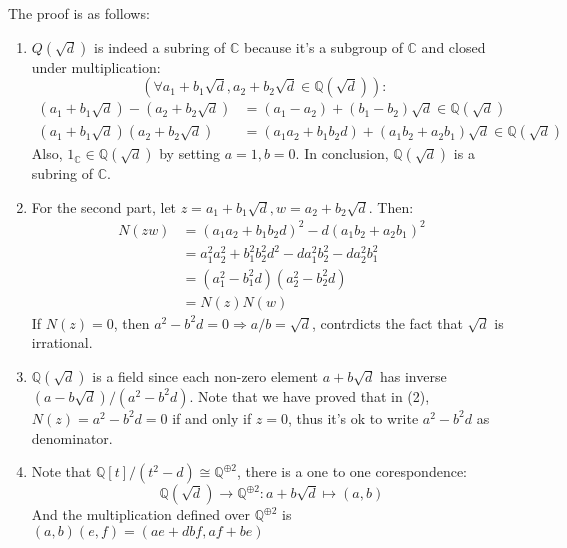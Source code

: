 \documentclass[a4paper, pdf, 12pt]{article}
\makeatletter
\renewenvironment{proof}[1][\proofname]{\par
  \pushQED{\qed}%
  \normalfont \topsep6\p@\@plus6\p@\relax
  \trivlist
  \item[%
    \hskip\labelsep
    \normalfont\bfseries %
    #1%
    \@addpunct{.}%
  ]\ignorespaces
}{%
  \popQED\endtrivlist\@endpefalse
}
\let\qed\relax %
\DeclareRobustCommand{\qed}{%
  \ifmmode \mathqed
  \else
    \leavevmode\unskip\penalty\@M\hbox{}\nobreak\hspace{.5em minus .1em}%
    \hbox{\qedsymbol}%
  \fi
}
\makeatother
\begin{document}
\begin{proof}
  The proof is as follows:
  \begin{enumerate}
  \item $Q(\sqrt{d})$ is indeed a subring of $\mathbb{C}$ because it's a subgroup of $\mathbb{C}$ and closed under 
  multiplication: 
  $$
  (\forall a_1+b_1\sqrt{d}, a_2+b_2\sqrt{d}\in \mathbb{Q}(\sqrt{d})):\quad 
  $$
  $$
  \begin{aligned}
    (a_1+b_1\sqrt{d}) - (a_2+b_2\sqrt{d}) &= (a_1 - a_2) + (b_1-b_2)\sqrt{d}\in \mathbb{Q}(\sqrt{d})\\
    (a_1+b_1\sqrt{d})(a_2 + b_2\sqrt{d}) &= (a_1a_2 + b_1b_2d) + (a_1b_2 + a_2b_1)\sqrt{d}\in \mathbb{Q}(\sqrt{d})
  \end{aligned}
  $$
  Also, $1_{\mathbb{C}}\in \mathbb{Q}(\sqrt{d})$ by setting $a = 1, b = 0$. In conclusion, $\mathbb{Q}(\sqrt{d})$ is a subring of 
  $\mathbb{C}$.

  \item For the second part, let $z = a_1+b_1\sqrt{d}, w = a_2+b_2\sqrt{d}$. Then:
  $$
  \begin{aligned}
    N(zw) &= (a_1a_2+b_1b_2d)^2 - d(a_1b_2 + a_2b_1)^2\\
    &= a_1^2a_2^2 + b_1^2b_2^2d^2 - da_1^2b_2^2-da_2^2b_1^2\\
    &= (a_1^2-b_1^2d)(a_2^2-b_2^2d)\\
    &= N(z)N(w)
  \end{aligned}
  $$
  If $N(z) = 0$, then $a^2-b^2d=0\Rightarrow a/b=\sqrt{d}$, contrdicts the fact that $\sqrt{d}$ is irrational.

  \item $\mathbb{Q}(\sqrt{d})$ is a field since each non-zero element $a+b\sqrt{d}$ has inverse $(a-b\sqrt{d})/(a^2-b^2d)$. Note that 
  we have proved that in (2), $N(z) = a^2-b^2d = 0$ if and only if $z = 0$, thus it's ok to write $a^2-b^2d$ as denominator.
  
  \item Note that $\mathbb{Q}[t]/(t^2 - d)\cong \mathbb{Q}^{\oplus 2}$, there is a one to one corespondence:
  $$
  \mathbb{Q}(\sqrt{d})\rightarrow \mathbb{Q}^{\oplus 2}: a+b\sqrt{d}\mapsto (a, b)
  $$
  And the multiplication defined over $\mathbb{Q}^{\oplus 2}$ is $(a, b)(e, f)=(ae+dbf, af+be)$
\end{enumerate}
\end{proof}
\end{document}
